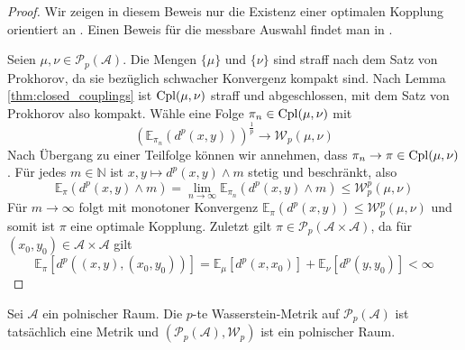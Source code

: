 \begin{proof}
    Wir zeigen in diesem Beweis nur die Existenz einer optimalen Kopplung orientiert an \cite[Satz 4.1]{villani}. Einen Beweis für die messbare Auswahl findet man in \cite[Korollar 5.22]{villani}. 
    
    Seien $\mu, \nu \in \mathcal{P}_p(\mathcal{A})$. Die Mengen $\{\mu\}$ und $\{\nu\}$ sind straff nach dem Satz von Prokhorov, da sie bezüglich schwacher Konvergenz kompakt sind. Nach Lemma \ref{thm:closed_couplings} ist $\operatorname{Cpl}(\mu, \nu)$ straff und abgeschlossen, mit dem Satz von Prokhorov also kompakt. Wähle eine Folge $\pi_n\in \operatorname{Cpl}(\mu, \nu)$ mit 
    $$\left(\mathbb{E}_{\pi_n}(d^p(x,y))\right)^{\frac{1}{p}} \rightarrow \mathcal{W}_p(\mu, \nu)$$
    Nach Übergang zu einer Teilfolge können wir annehmen, dass $\pi_n \rightarrow \pi \in \operatorname{Cpl}(\mu, \nu)$. Für jedes $m \in \mathbb{N}$ ist $x,y\mapsto d^p(x,y)\wedge m$ stetig und beschränkt, also 
    $$\mathbb{E}_\pi(d^p(x,y)\wedge m) = \lim_{n\rightarrow \infty} \mathbb{E}_{\pi_n}(d^p(x,y) \wedge m) \leq \mathcal{W}_p^p(\mu, \nu)$$
    Für $m \rightarrow \infty$ folgt mit monotoner Konvergenz $\mathbb{E}_\pi(d^p(x,y))\leq \mathcal{W}_p^p(\mu, \nu)$ und somit ist $\pi$ eine optimale Kopplung. Zuletzt gilt $\pi \in \mathcal{P}_p(\mathcal{A}\times \mathcal{A})$, da für $(x_0, y_0) \in \mathcal{A}\times \mathcal{A}$ gilt 
    $$\mathbb{E}_{\pi}\left[d^p\left((x,y), (x_0,y_0)\right)\right] = \mathbb{E}_\mu\left[d^p(x,x_0)\right] + \mathbb{E}_\nu\left[d^p(y,y_0)\right] < \infty$$
\end{proof}
\begin{lemma}\label{thm:pp_is_polish}
    Sei $\mathcal{A}$ ein polnischer Raum. Die $p$-te Wasserstein-Metrik auf $\mathcal{P}_p(\mathcal{A})$ ist tatsächlich eine Metrik und $(\mathcal{P}_p(\mathcal{A}), \mathcal{W}_p)$ ist ein polnischer Raum.
\end{lemma}
